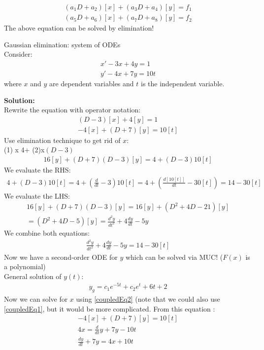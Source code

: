 \begin{align*}
(a_1D+a_2)[x]+(a_3D+a_4)[y]=f_1\\
(a_5D+a_6)[x]+(a_7D+a_8)[y]=f_2
\end{align*}
The above equation can be solved by elimination!


\begin{exmp}{Gaussian elimination: system of ODEs}\\
Consider:
\begin{align*}
x'-3x+4y=1\\
y'-4x+7y=10t
\end{align*}
where $x$ and $y$ are dependent variables and $t$ is the independent variable.

\textbf{Solution:}\\
Rewrite the equation with operator notation:
\begin{align}
(D-3)[x]+4[y]=1 \label{coupledEq1}\\
-4[x]+(D+7)[y]=10[t]
\label{coupledEq2}
\end{align}
Use elimination technique to get rid of $x$:\\
(1) x 4+ (2)x$(D-3)$\\
\begin{align*}
16 [y] +(D+7)(D-3)[y]=4+(D-3)10[t]
\end{align*}
We evaluate the RHS:
\begin{align*}
4+(D-3)10[t]=4+(\frac{d}{dt}-3)10[t]=4+(\frac{d[10[t]]}{dt}-30[t])=14-30[t]
\end{align*}
We evaluate the LHS:
\begin{align*}
16 [y] +(D+7)(D-3)[y]=16 [y] +(D^2+4D-21)[y]\\=(D^2+4D-5)[y]=\frac{d^2y}{dt^2}+4\frac{dy}{dt}-5y
\end{align*}
We combine both equations:
\begin{align*}
\boxed{\frac{d^2y}{dt^2}+4\frac{dy}{dt}-5y=14-30[t]}
\end{align*}
Now we have a second-order ODE for $y$ which can be solved via MUC! ($F(x)$ is a polynomial)\\
General solution of $y(t)$:
\begin{align}
y_g=c_1e^{-5t}+c_2e^t+6t+2
\label{coupledGen}
\end{align}
Now we can solve for $x$ using \eqref{coupledEq2} (note that we could also use \eqref{coupledEq1}, but it would be more complicated. From this equation :
\begin{align*}
-4[x]+(D+7)[y]=10[t]\\
4x=\frac{d}{dt}y+7y-10t\\
\frac{dy}{dt}+7y=4x  +10 t
\end{align*}


\end{exmp}
